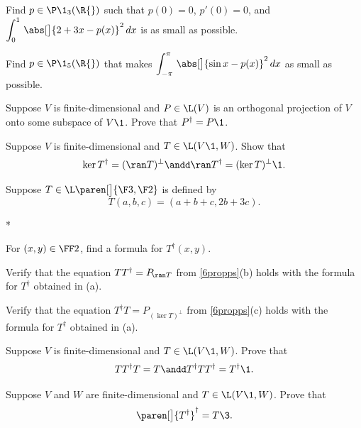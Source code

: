 \exercise
Find $p \in \P\1_3(\R{})$ such that $p(0) = 0$, $p' \! (0) = 0$, and
$ \displaystyle
\int_0^1 \, \abs[\big]{2 + 3x - p(x)}^2 \,dx
$
is as small as possible.


\exercise
Find $p \in \P\1_5(\R{})$ that makes
$ \displaystyle
\int_{-\pi}^{\pi} \, \abs[\big]{\sin x - p(x)}^2\,dx
$
as small as possible.


\exercise
Suppose $V$ is finite-dimensional and $P \in \L(V)$ is an orthogonal projection of $V$ onto some subspace of $V\1$. Prove that $P^\dagger = P\1$.\label{3dagger}


\exercise
Suppose $V$ is finite-dimensional and $T \in \L(V\1, W)$. Show that \label{5NullRanTd}
\[
\ker T^\dagger = (\ran T)^\perp \andd \ran T^\dagger = (\ker T)^\perp\1.
\]
\exercisedisplayend


\exercise
Suppose $T \in \L\paren[\big]{ \F3, \F2 }$ is defined by
\[
T(a, b, c) = (a + b + c, 2b + 3c).
\]
\begin{subtheorem}*
\item
For $(x, y) \in \FF2$, find a formula for $T^\dagger(x,y)$.
\item
Verify that the equation $TT^\dagger = P_{\!\ran T}$ from \ref{6propps}(b) holds with the formula for $T^\dagger$ obtained in (a).
\item
Verify that the equation $T^\dagger T = P_{\!(\ker T)^\perp}$ from \ref{6propps}(c) holds with the formula for $T^\dagger$ obtained in (a).
\end{subtheorem}
\exercisesubtheoremend


\exercise
Suppose $V$ is finite-dimensional and $T \in \L(V\1, W)$. Prove that
\[
TT^\dagger T = T \andd T^\dagger T T^\dagger = T^\dagger\1.
\]
\exercisedisplayend
{}


\exercise
Suppose $V$ and $W$ are finite-dimensional and $T \in \L(V\1, W)$. Prove that\label{2dag}
\[
\paren[\big]{T^\dagger}^\dagger = T\3.
\]
\exercisedisplayend
{}


